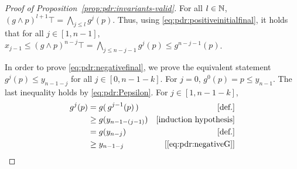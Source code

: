 \begin{proof}[Proof of Proposition~\ref{prop:pdr:invariants-valid}]
	\newline\noindent
	For all $l\in \mathbb{N}$, $(g \land p)^{l+1}\top = \bigwedge_{j\leq l}g^j(p)$. Thus, using \eqref{eq:pdr:positiveinitialfinal}, it holds that for all $j\in [1,n-1]$, $x_{j-1} \leq (g \land p)^{n-j} \top = \bigwedge_{j\leq n-j-1}g^j(p) \leq g^{n-j-1}(p)$.

	\newline\noindent
	In order to prove \eqref{eq:pdr:negativefinal}, we prove the equivalent statement $g^j(p) \leq y_{n-1-j}$ for all $j\in [0,n-1-k]$.
	For $j=0$, $g^0(p)=p \leq y_{n-1}$. The last inequality holds by \eqref{eq:pdr:Pepsilon}. For $j\in [1,n-1-k]$,
	\begin{align*}
		g^{j}(p)
		 & = g (\, g^{j-1} (p) \,) & [\text{def.}]                 \\
		 & \geq g(y_{n-1-(j-1)} )  & [\text{induction hypothesis}] \\
		 & = g(y_{n-j} )           & [\text{def.}]                 \\
		 & \geq y_{n-1-j}          & [\eqref{eq:pdr:negativeG}]
	\end{align*}
\end{proof}

